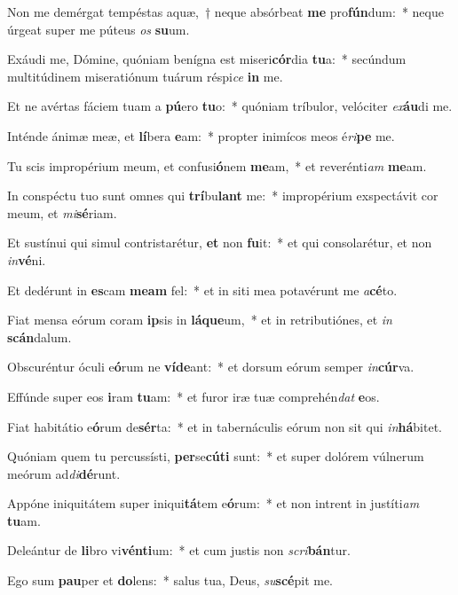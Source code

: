 \item Non me demérgat tempéstas aquæ,~† neque absórbeat \textbf{me} pro\textbf{fún}dum:~* neque úrgeat super me púteus \textit{os} \textbf{su}um.
\item Exáudi me, Dómine, quóniam benígna est miseri\textbf{cór}dia \textbf{tu}a:~* secúndum multitúdinem miseratiónum tuárum réspi\textit{ce} \textbf{in} me.
\item Et ne avértas fáciem tuam a \textbf{pú}ero \textbf{tu}o:~* quóniam tríbulor, velóciter \textit{ex}\textbf{áu}di me.
\item Inténde ánimæ meæ, et \textbf{lí}bera \textbf{e}am:~* propter inimícos meos é\textit{ri}\textbf{pe} me.
\item Tu scis impropérium meum, et confusi\textbf{ó}nem \textbf{me}am,~* et reverénti\textit{am} \textbf{me}am.
\item In conspéctu tuo sunt omnes qui \textbf{trí}bu\textbf{lant} me:~* impropérium exspectávit cor meum, et \textit{mi}\textbf{sé}riam.
\item Et sustínui qui simul contristarétur, \textbf{et} non \textbf{fu}it:~* et qui consolarétur, et non \textit{in}\textbf{vé}ni.
\item Et dedérunt in \textbf{es}cam \textbf{me}\textbf{am} fel:~* et in siti mea potavérunt me \textit{a}\textbf{cé}to.
\item Fiat mensa eórum coram \textbf{ip}sis in \textbf{lá}\textbf{que}um,~* et in retributiónes, et \textit{in} \textbf{scán}dalum.
\item Obscuréntur óculi e\textbf{ó}rum ne \textbf{ví}\textbf{de}ant:~* et dorsum eórum semper \textit{in}\textbf{cúr}va.
\item Effúnde super eos \textbf{i}ram \textbf{tu}am:~* et furor iræ tuæ comprehén\textit{dat} \textbf{e}os.
\item Fiat habitátio e\textbf{ó}rum de\textbf{sér}ta:~* et in tabernáculis eórum non sit qui \textit{in}\textbf{há}bitet.
\item Quóniam quem tu percussísti, \textbf{per}se\textbf{cú}\textbf{ti} sunt:~* et super dolórem vúlnerum meórum ad\textit{di}\textbf{dé}runt.
\item Appóne iniquitátem super iniqui\textbf{tá}tem e\textbf{ó}rum:~* et non intrent in justíti\textit{am} \textbf{tu}am.
\item Deleántur de \textbf{li}bro vi\textbf{vén}\textbf{ti}um:~* et cum justis non \textit{scri}\textbf{bán}tur.
\item Ego sum \textbf{pau}per et \textbf{do}lens:~* salus tua, Deus, \textit{su}\textbf{scé}pit me.
